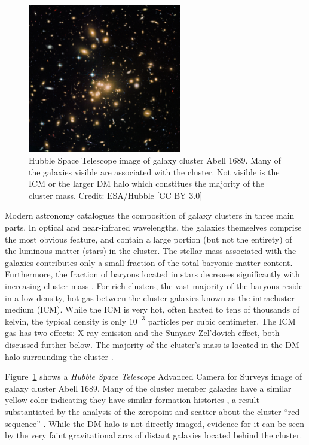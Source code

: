 \begin{figure}[t]
	\begin{center}
		\includegraphics[width=0.6\textwidth]{figures/abell1689_hubble.pdf} 
	\end{center}
	\caption[Hubble Space Telescope image of galaxy cluster Abell 1689.]{Hubble Space Telescope image of galaxy cluster Abell 1689. Many of the galaxies visible are associated with the cluster. Not visible is the ICM or the larger DM halo which constitues the majority of the cluster mass. Credit: ESA/Hubble [CC BY 3.0]}
	\label{fig: abell1689_hubble} 
\end{figure}

Modern astronomy catalogues the composition of galaxy clusters in three main parts. In optical and near-infrared wavelengths, the galaxies themselves comprise the most obvious feature, and contain a large portion (but not the entirety) of the luminous matter (stars) in the cluster. The stellar mass associated with the galaxies contributes only a small fraction of the total baryonic matter content. Furthermore, the fraction of baryons located in stars decreases significantly with increasing cluster mass \citep{Gonzalez2007}. For rich clusters, the vast majority of the baryons reside in a low-density, hot gas between the cluster galaxies known as the intracluster medium (ICM). While the ICM is very hot, often heated to tens of thousands of kelvin, the typical density is only $10^{-3}$ particles per cubic centimeter. The ICM gas has two effects: X-ray emission and the Sunyaev-Zel'dovich effect, both discussed further below. The majority of the cluster's mass is located in the DM halo surrounding the cluster . 

Figure~\ref{fig: abell1689_hubble} shows a \emph{Hubble Space Telescope} Advanced Camera for Surveys image of galaxy cluster Abell 1689. Many of the cluster member galaxies have a similar yellow color indicating they have similar formation histories , a result substantiated by the analysis of the zeropoint and scatter about the cluster ``red sequence'' . While the DM halo is not directly imaged, evidence for it can be seen by the very faint gravitational arcs of distant galaxies located behind the cluster.


